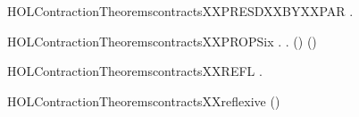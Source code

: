 \newcommand{\HOLContractionTheoremscontractsXXPRESDXXBYXXGUARDEDXXSUM}{\UseVerbatim{HOLContractionTheoremscontractsXXPRESDXXBYXXGUARDEDXXSUM}}
\begin{SaveVerbatim}{HOLContractionTheoremscontractsXXPRESDXXBYXXPAR}
\HOLTokenTurnstile{} \HOLSymConst{\HOLTokenForall{}}   .
          \HOLSymConst{\HOLTokenConj{}}    \HOLSymConst{\HOLTokenImp{}}
        \HOLSymConst{\ensuremath{\parallel}}    \HOLSymConst{\ensuremath{\parallel}} 
\end{SaveVerbatim}
\newcommand{\HOLContractionTheoremscontractsXXPRESDXXBYXXPAR}{\UseVerbatim{HOLContractionTheoremscontractsXXPRESDXXBYXXPAR}}
\begin{SaveVerbatim}{HOLContractionTheoremscontractsXXPROPSix}
\HOLTokenTurnstile{} \HOLSymConst{\HOLTokenForall{}} .    \HOLSymConst{\HOLTokenImp{}} \HOLSymConst{\HOLTokenForall{}}.  () ()
\end{SaveVerbatim}
\newcommand{\HOLContractionTheoremscontractsXXPROPSix}{\UseVerbatim{HOLContractionTheoremscontractsXXPROPSix}}
\begin{SaveVerbatim}{HOLContractionTheoremscontractsXXREFL}
\HOLTokenTurnstile{} \HOLSymConst{\HOLTokenForall{}}.   
\end{SaveVerbatim}
\newcommand{\HOLContractionTheoremscontractsXXREFL}{\UseVerbatim{HOLContractionTheoremscontractsXXREFL}}
\begin{SaveVerbatim}{HOLContractionTheoremscontractsXXreflexive}
\HOLTokenTurnstile{}  ()
\end{SaveVerbatim}
\newcommand{\HOLContractionTheoremscontractsXXreflexive}{\UseVerbatim{HOLContractionTheoremscontractsXXreflexive}}
